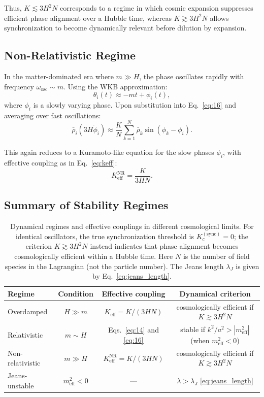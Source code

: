 Thus, $K \lesssim 3H^2N$ corresponds to a regime in which cosmic expansion suppresses efficient phase alignment over a Hubble time, whereas $K \gtrsim 3H^2N$ allows synchronization to become dynamically relevant before dilution by expansion.

\subsection{Non-Relativistic Regime}

In the matter-dominated era where $m \gg H$, the phase oscillates rapidly with frequency $\omega_{\mathrm{osc}} \sim m$. Using the WKB approximation:
\begin{equation}
\label{eq:wkb_phase}
\theta_i(t) \approx -mt + \phi_i(t),
\end{equation}
where $\phi_i$ is a slowly varying phase. Upon substitution into Eq.~\eqref{eq:16} and averaging over fast oscillations:
\begin{equation}
\label{eq:slow_phase}
\bar{\rho}_i(3H\dot{\phi}_i) \approx \frac{K}{N}\sum_{k=1}^N \bar{\rho}_k\sin(\phi_k - \phi_i).
\end{equation}

This again reduces to a Kuramoto-like equation for the slow phases $\phi_i$, with effective coupling as in Eq.~\eqref{eq:keff}:
\begin{equation}
\label{eq:keff_nr}
K_{\mathrm{eff}}^{\mathrm{NR}} = \frac{K}{3HN}.
\end{equation}

\subsection{Summary of Stability Regimes}

\begin{table}[t]
\centering
\caption{Dynamical regimes and effective couplings in different cosmological limits. For identical oscillators, the true synchronization threshold is $K_c^{(\mathrm{sync})}=0$; the criterion $K \gtrsim 3H^2N$ instead indicates that phase alignment becomes cosmologically efficient within a Hubble time. Here $N$ is the number of field species in the Lagrangian (not the particle number). The Jeans length $\lambda_J$ is given by Eq.~\eqref{eq:jeans_length}.}
\label{tab:stability_regimes}
\begin{tabular*}{\textwidth}{@{\extracolsep{\fill}}lccc@{}}
\hline\hline
Regime & Condition & Effective coupling & Dynamical criterion \\
\hline
Overdamped & $H \gg m$ & $K_{\mathrm{eff}} = K/(3HN)$ & cosmologically efficient if $K \gtrsim 3H^2N$ \\
Relativistic & $m \sim H$ & Eqs.~\eqref{eq:14} and \eqref{eq:16} & stable if $k^2/a^2 > |m_{\mathrm{eff}}^2|$ (when $m_{\mathrm{eff}}^2<0$) \\
Non-relativistic & $m \gg H$ & $K_{\mathrm{eff}}^{\mathrm{NR}} = K/(3HN)$ & cosmologically efficient if $K \gtrsim 3H^2N$ \\
Jeans-unstable & $m_{\mathrm{eff}}^2<0$ & --- & $\lambda > \lambda_J$ \eqref{eq:jeans_length} \\
\hline\hline
\end{tabular*}
\end{table}

